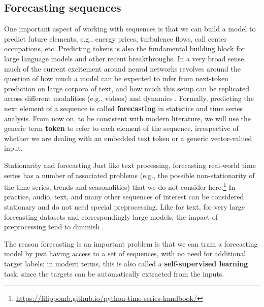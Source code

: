 \subsection{Forecasting sequences}

One important aspect of working with sequences is that we can build a model to predict future elements, e.g., energy prices, turbulence flows, call center occupations, etc. Predicting tokens is also the fundamental building block for large language models and other recent breakthroughs. In a very broad sense, much of the current excitement around neural networks revolves around the question of how much a model can be expected to infer from next-token prediction on large corpora of text, and how much this setup can be replicated across different modalities (e.g., videos) and dynamics \cite{wang2023scientific}. Formally, predicting the next element of a sequence is called \textbf{forecasting} in statistics and time series analysis. From now on, to be consistent with modern literature, we will use the generic term \textbf{token} to refer to each element of the sequence, irrespective of whether we are dealing with an embedded text token or a generic vector-valued input.

\begin{supportbox}{Stationarity and forecasting}
Just like text processing, forecasting real-world time series has a number of associated problems (e.g., the possible non-stationarity of the time series, trends and seasonalities) that we do not consider here.\footnote{\url{https://filippomb.github.io/python-time-series-handbook/}} In practice, audio, text, and many other sequences of interest can be considered stationary and do not need special preprocessing. Like for text, for very large forecasting datasets and correspondingly large models, the impact of preprocessing tend to diminish \cite{ansari2024chronos}.
\end{supportbox}

The reason forecasting is an important problem is that we can train a forecasting model by just having access to a set of sequences, with no need for additional target labels: in modern terms, this is also called a \textbf{self-supervised learning} task, since the targets can be automatically extracted from the inputs. 

